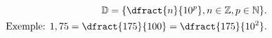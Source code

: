 \documentclass[preview]{standalone}
\begin{document}
\begin{align*}
\mathbb{D} = \{\dfract{n}{10^p},n\in \mathbb{Z},p\in \mathbb{N}\}. \\ \text{Exemple: } 1,75 = \dfract{175}{100} = \dfract{175}{10^2}.
\end{align*}
\end{document}
